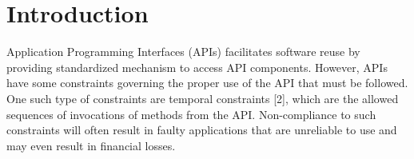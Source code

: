 \section{Introduction}
\label{sec:introduction}




Application Programming Interfaces (APIs) facilitates software reuse
by providing standardized mechanism to access API components.
However, APIs have some constraints governing the proper use of the API that must be followed.
One such type of constraints are temporal constraints [2], which are the allowed sequences of invocations of methods from the API.
Non-compliance to such constraints will often result in faulty applications that are unreliable to use and may even result in financial losses.



